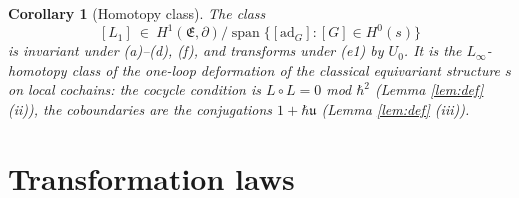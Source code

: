 \documentclass[10pt]{article}
\newtheorem{corollary}[theorem]{Corollary}
\theoremstyle{definition}
\newcommand{\E}{\mathfrak E}
\newcommand{\ad}{\mathrm{ad}}
\begin{document}
\begin{corollary}[Homotopy class]\label{cor:hclass}
The class
\[
[L_1]\ \in\ H^1(\E,\partial)\big/\operatorname{span}\{[\ad_G]:[G]\in H^0(s)\}
\]
is invariant under (a)--(d), (f), and transforms under (e1) by $U_0$. It is the $L_\infty$-homotopy class of the one-loop deformation of the classical equivariant structure $s$ on local cochains: the cocycle condition is $L\circ L=0$ mod $\hbar^2$ (Lemma \ref{lem:def} (ii)), the coboundaries are the conjugations $1+\hbar\mathfrak u$ (Lemma \ref{lem:def} (iii)).
\end{corollary}

\section{Transformation laws}
\end{document}

